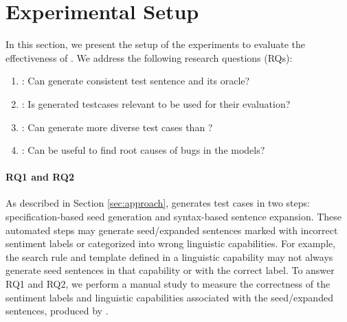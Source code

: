 \section{Experimental Setup}
\label{sec:experiment}
%


In this section, we present the setup of the experiments to evaluate
the effectiveness of \tool{}. We address the following research
questions (RQs):


\begin{enumerate}[label=\textbf{RQ\arabic*}]
\item \label{rq:one}: Can \tool generate consistent test sentence and
  its oracle?
\item \label{rq:two}: Is \tool generated testcases relevant to be used
  for their \lc evaluation?
\item \label{rq:three}: Can \tool generate more diverse test cases
  than \Cklst?
\item \label{rq:four}: Can \tool be useful to find root causes of bugs
  in the \sa models?
\end{enumerate}



\paragraph{\textbf{RQ1 and RQ2}} As described in Section \ref{sec:approach},
\tool generates test cases in two steps: specification-based seed
generation and syntax-based sentence expansion. These automated steps
may generate seed/expanded sentences marked with incorrect sentiment
labels or categorized into wrong linguistic capabilities. For example,
the search rule and template defined in a linguistic capability may
not always generate seed sentences in that capability or with the
correct label.  To answer RQ1 and RQ2, we perform a manual study to
measure the correctness of the sentiment labels and linguistic
capabilities associated with the seed/expanded sentences, produced by
\tool.

